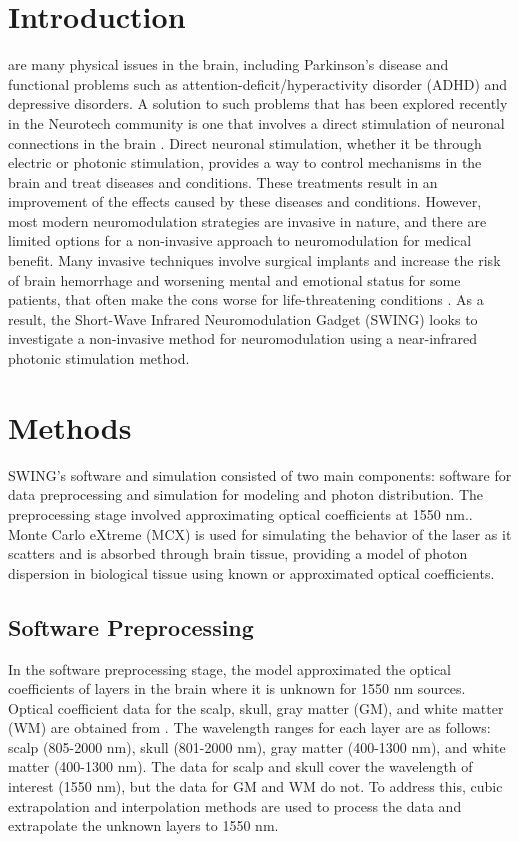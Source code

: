 \documentclass[journal,twoside,web]{ieeecolor}
\begin{document}
\section{Introduction}
\label{sec:introduction}
 are many physical issues in the brain, including Parkinson's disease and functional 
problems such as attention-deficit/hyperactivity disorder (ADHD) and depressive disorders. 
A solution to such problems that has been explored recently in the Neurotech community is one that involves a direct stimulation of  
neuronal connections in the brain \cite{b1,b2,b3}. Direct neuronal stimulation, whether it be through electric or photonic 
stimulation, provides a way to control mechanisms in the brain and treat diseases and conditions. These treatments result 
in an improvement of the effects caused by these diseases and conditions. However, most modern neuromodulation strategies 
are invasive in nature, and there are limited options for a non-invasive approach to neuromodulation for medical benefit. Many invasive 
techniques involve surgical implants and increase the risk of brain hemorrhage and worsening mental and emotional status for some patients,  
that often make the cons worse for life-threatening conditions \cite{b1,b4}. As a result, the Short-Wave Infrared Neuromodulation Gadget (SWING) 
looks to investigate a non-invasive method for neuromodulation using a near-infrared photonic stimulation method. 


\section{Methods}
\label{sec:methods}
SWING's software and simulation consisted of two main components: software for data preprocessing and simulation for modeling and photon distribution. 
The preprocessing stage involved approximating optical coefficients at 1550 nm.. Monte Carlo eXtreme (MCX) is used for simulating the 
behavior of the laser as it scatters and is absorbed through brain tissue, providing a model of photon dispersion in biological tissue using known or 
approximated optical coefficients.

\subsection{Software Preprocessing}
In the software preprocessing stage, the model approximated the optical coefficients of layers in the brain where it is unknown for 1550 nm sources. 
Optical coefficient data for the scalp, skull, gray matter (GM), and white matter (WM) are obtained from \cite{b7}. The wavelength ranges for each layer are as follows: scalp (805-2000 nm), 
skull (801-2000 nm), gray matter (400-1300 nm), and white matter (400-1300 nm). The data for scalp and skull cover the wavelength of interest (1550 nm), but the data 
for GM and WM do not. To address this, cubic extrapolation and interpolation methods are used to process the data and extrapolate the unknown layers to 1550 nm. 
\end{document}
